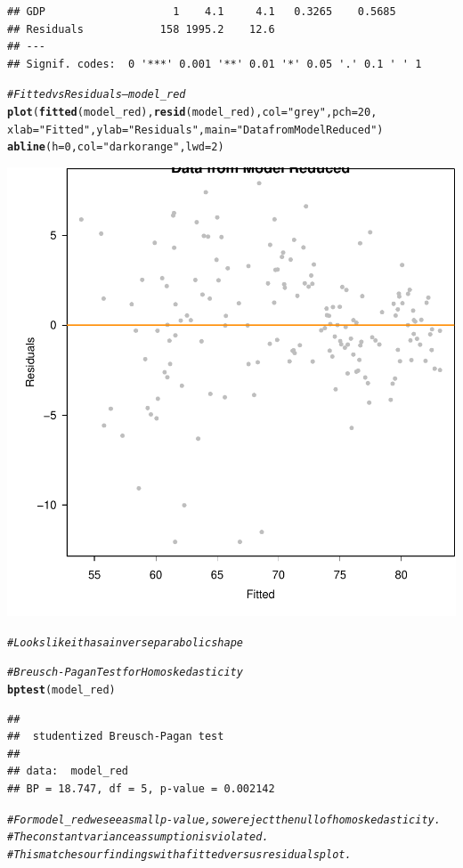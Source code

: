 \documentclass{article}\usepackage[]{graphicx}\usepackage[]{color}
\makeatletter
\newcommand{\hlnum}[1]{\textcolor[rgb]{0.686,0.059,0.569}{#1}}%
\newcommand{\hlstr}[1]{\textcolor[rgb]{0.192,0.494,0.8}{#1}}%
\newcommand{\hlcom}[1]{\textcolor[rgb]{0.678,0.584,0.686}{\textit{#1}}}%
\newcommand{\hlstd}[1]{\textcolor[rgb]{0.345,0.345,0.345}{#1}}%
\newcommand{\hlkwc}[1]{\textcolor[rgb]{0.333,0.667,0.333}{#1}}%
\newcommand{\hlkwd}[1]{\textcolor[rgb]{0.737,0.353,0.396}{\textbf{#1}}}%
\newenvironment{kframe}{%
 \def\at@end@of@kframe{}%
 \ifinner\ifhmode%
  \def\at@end@of@kframe{\end{minipage}}%
  \begin{minipage}{\columnwidth}%
 \fi\fi%
 \def\FrameCommand##1{\hskip\@totalleftmargin \hskip-\fboxsep
 \colorbox{shadecolor}{##1}\hskip-\fboxsep
     \hskip-\linewidth \hskip-\@totalleftmargin \hskip\columnwidth}%
 \MakeFramed {\advance\hsize-\width
   \@totalleftmargin\z@ \linewidth\hsize
   \@setminipage}}%
 {\par\unskip\endMakeFramed%
 \at@end@of@kframe}
\newenvironment{knitrout}{}{} %
\makeatother
\begin{document}
\begin{knitrout}
\begin{kframe}
\begin{verbatim}
## GDP                    1    4.1     4.1   0.3265    0.5685    
## Residuals            158 1995.2    12.6                       
## ---
## Signif. codes:  0 '***' 0.001 '**' 0.01 '*' 0.05 '.' 0.1 ' ' 1
\end{verbatim}
\begin{alltt}
\hlcom{# Fitted vs Residuals --- model_red}
\hlkwd{plot}\hlstd{(}\hlkwd{fitted}\hlstd{(model_red),} \hlkwd{resid}\hlstd{(model_red),} \hlkwc{col} \hlstd{=} \hlstr{"grey"}\hlstd{,} \hlkwc{pch} \hlstd{=} \hlnum{20}\hlstd{,}
     \hlkwc{xlab} \hlstd{=} \hlstr{"Fitted"}\hlstd{,} \hlkwc{ylab} \hlstd{=} \hlstr{"Residuals"}\hlstd{,} \hlkwc{main} \hlstd{=} \hlstr{"Data from Model Reduced"}\hlstd{)}
\hlkwd{abline}\hlstd{(}\hlkwc{h} \hlstd{=} \hlnum{0}\hlstd{,} \hlkwc{col} \hlstd{=} \hlstr{"darkorange"}\hlstd{,} \hlkwc{lwd} \hlstd{=} \hlnum{2}\hlstd{)}
\end{alltt}
\end{kframe}

{\centering \includegraphics[width=.6\linewidth]{figure/Analysis-Rnwauto-report-24} 

}


\begin{kframe}\begin{alltt}
\hlcom{# Looks like it has a inverse parabolic shape}

\hlcom{# Breusch-Pagan Test for Homoskedasticity}
\hlkwd{bptest}\hlstd{(model_red)}
\end{alltt}
\begin{verbatim}
## 
## 	studentized Breusch-Pagan test
## 
## data:  model_red
## BP = 18.747, df = 5, p-value = 0.002142
\end{verbatim}
\begin{alltt}
\hlcom{# For model_red we see a small p-value, so we reject the null of homoskedasticity. }
\hlcom{# The constant variance assumption is violated. }
\hlcom{# This matches our findings with a fitted versus residuals plot.}


\end{alltt}
\end{kframe}
\end{knitrout}
\end{document}
